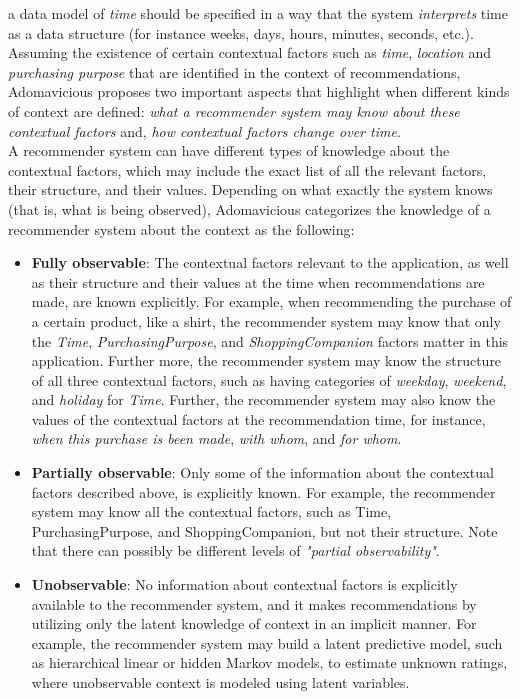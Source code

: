 a data model of \textit{time} should be specified in a way that the system
\textit{interprets} time as a data structure (for instance weeks, 
days, hours, minutes, seconds, etc.). \\
Assuming the existence of certain contextual factors such as
\textit{time}, \textit{location} and \textit{purchasing purpose} that
are identified in the context of recommendations,
Adomavicious  \cite{adomavicius2011context} proposes two important
aspects that highlight when different kinds of context are defined:
\textit{what a recommender system may know about these contextual
factors} and, \textit{how contextual factors change over time}.\\
A recommender system can have different types of knowledge 
about the contextual factors, which may
include the exact list of all the relevant factors, their structure,
and their values. Depending on what
exactly the system knows (that  is, what is being observed),
Adomavicious categorizes the knowledge of a recommender system about
the context as the following:
	\begin{itemize}
	\item \textbf{Fully observable}: The contextual factors relevant to the 
	application, as well as their structure and their values at the time when 
	recommendations are made, are known explicitly. For example, when
	recommending the purchase of a certain product, like a shirt, the 
	recommender system may know that only the \textit{Time}, \textit{PurchasingPurpose}, 
	and \textit{ShoppingCompanion} factors matter in this application. Further more, 
	the recommender system may know the structure of all three contextual 
	factors, such as having categories of \textit{weekday}, \textit{weekend}, 
	and \textit{holiday} for \textit{Time}. Further, the recommender system 
	may also know the values of the contextual factors at the recommendation 
	time, for instance, \textit{when this purchase is been made}, 
	\textit{with whom}, and \textit{for whom}.
	\item \textbf{Partially observable}: Only some of the information about 
	the contextual factors described above, is explicitly known. For example, 
	the recommender system may know all the contextual factors, such as Time, 
	PurchasingPurpose, and ShoppingCompanion, but not their structure. Note that 
	there can possibly be different levels of \textit{"partial observability"}. 
	\item \textbf{Unobservable}: No information about contextual factors is 
	explicitly available to the recommender system, and it makes recommendations 
	by utilizing only the latent knowledge of context in an implicit manner. 
	For example, the recommender system may build a latent predictive model, 
	such as hierarchical linear or hidden Markov models, to estimate unknown 
	ratings, where unobservable context is modeled using latent variables.
	\end{itemize}

